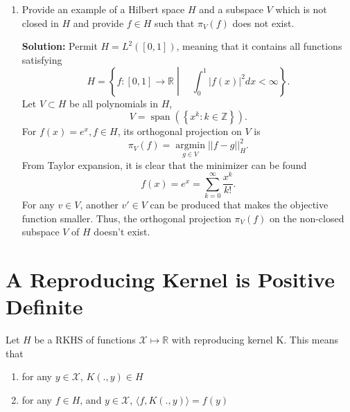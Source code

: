 \documentclass{article}[12pt]
\begin{document}
\begin{enumerate}
\item Provide an example of a Hilbert space $H$ and a subspace $V$ which is not closed in $H$ and provide $f \in H$ such that $\pi_V(f)$ does not exist. 

	\textbf{Solution:} Permit $H = L^2([0,1])$, meaning that it contains all functions satisfying 
	\begin{equation}
	H = \left\{f : [0,1] \rightarrow \mathbb R \middle| \quad \int_0^1 |f(x)|^2 dx < \infty \right\}.
	\end{equation}
	Let $V \subset H$ be all polynomials in $H$, 
	\begin{equation}
		V = \operatorname{span}\left( \left\{ x^k: k \in \mathbb Z \right\} \right).
	\end{equation}
	For $f(x) = e^x, f \in H$, its orthogonal projection on $V$ is 
	\begin{equation}
		\pi_V (f) = \operatorname*{argmin}_{g \in V} || f - g ||_H^2.
	\end{equation}
	From Taylor expansion, it is clear that the minimizer can be found 
	\begin{equation}
		f(x) = e^x = \sum_{k=0}^{\infty} \frac{x^k}{k!}. 
	\end{equation}
	For any $v \in V$, another $v' \in V$ can be produced that makes the objective function smaller. Thus, the orthogonal projection $\pi_V(f)$ on the non-closed subspace $V$ of $H$ doesn't exist.  
	
\end{enumerate}

\section{A Reproducing Kernel is Positive Definite}
Let $H$ be a RKHS of functions $\mathcal{X} \mapsto \mathbb{R}$ with reproducing kernel K. This means that 
\begin{enumerate}
\item for any $y \in \mathcal{X}$, $K(.,y) \in H$
\item for any $f \in H$, and $y \in \mathcal{X}$, $\langle f, K(.,y) \rangle = f(y)$
\end{enumerate}
\end{document}
